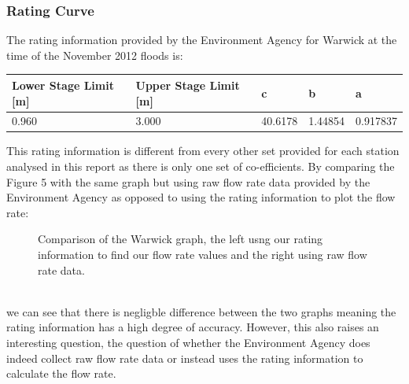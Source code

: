 \documentclass[11 pt, a4paper]{article}
\begin{document}
\subsubsection{Rating Curve}
The rating information provided by the Environment Agency for Warwick at the time of the November 2012 floods is:
\begin{center}
\begin{tabular}{|l|l|l|l|l|}
\hline
Lower Stage Limit {[}m{]} & Upper Stage Limit {[}m{]} & c & b & a \\
\hline
0.960 & 3.000 & 40.6178 & 1.44854 & 0.917837 \\
\hline
\end{tabular}
\end{center}
This rating information is different from every other set provided for each station analysed in this report as there is only one set of co-efficients. By comparing the Figure 5 with the same graph but using raw flow rate data provided by the Environment Agency as opposed to using the rating information to plot the flow rate:
\begin{figure}[h!]
\centering
{}
\hfill
{}
\caption{Comparison of the Warwick graph, the left usng our rating information to find our flow rate values and the right using raw flow rate data.}
\end{figure}\\
we can see that there is negligble difference between the two graphs meaning the rating information has a high degree of accuracy. However, this also raises an interesting question, the question of whether the Environment Agency does indeed collect raw flow rate data or instead uses the rating information to calculate the flow rate.
\end{document}
